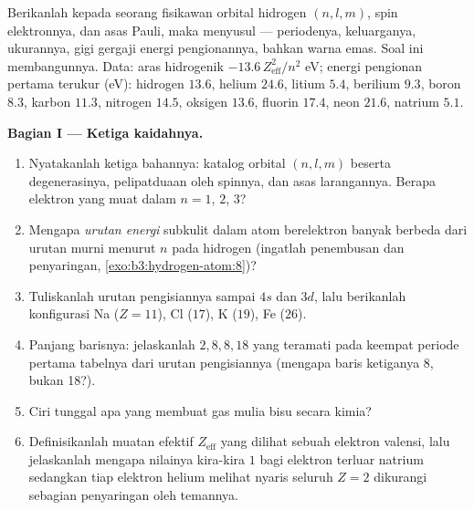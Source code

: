 \begin{problem}\label{pb:b3:identical-particles:1}
Berikanlah kepada seorang fisikawan orbital hidrogen $(n, l, m)$, spin
elektronnya, dan asas Pauli, maka  menyusul ---
periodenya, keluarganya, ukurannya, gigi gergaji energi pengionannya,
bahkan warna emas. Soal ini membangunnya. Data: aras hidrogenik
$-13.6\,Z_{\text{eff}}^2/n^2$ eV; energi pengionan pertama terukur (eV):
hidrogen $13.6$, helium $24.6$, litium $5.4$, berilium $9.3$, boron $8.3$,
karbon $11.3$, nitrogen $14.5$, oksigen $13.6$, fluorin $17.4$, neon $21.6$,
natrium $5.1$.

\medskip\noindent\textbf{Bagian I --- Ketiga kaidahnya.}
\begin{enumerate}
  \item Nyatakanlah ketiga bahannya: katalog orbital $(n, l, m)$
        beserta degenerasinya, pelipatduaan oleh spinnya, dan asas
        larangannya. Berapa elektron yang muat dalam $n = 1$, $2$, $3$?
  \item Mengapa \emph{urutan energi} subkulit dalam atom berelektron
        banyak berbeda dari urutan murni menurut $n$ pada hidrogen
        (ingatlah penembusan dan penyaringan,
        \cref{exo:b3:hydrogen-atom:8})?
  \item Tuliskanlah urutan pengisiannya sampai $4s$ dan $3d$, lalu
        berikanlah konfigurasi Na ($Z = 11$), Cl ($17$), K ($19$),
        Fe ($26$).
  \item Panjang barisnya: jelaskanlah $2, 8, 8, 18$ yang teramati pada
        keempat periode pertama tabelnya dari urutan pengisiannya
        (mengapa baris ketiganya 8, bukan 18?).
  \item Ciri tunggal apa yang membuat gas mulia bisu secara kimia?
  \item Definisikanlah muatan efektif $Z_{\text{eff}}$ yang dilihat
        sebuah elektron valensi, lalu jelaskanlah mengapa nilainya
        kira-kira $1$ bagi elektron terluar natrium sedangkan tiap
        elektron helium melihat nyaris seluruh $Z = 2$ dikurangi
        sebagian penyaringan oleh temannya.
\end{enumerate}


\end{problem}
